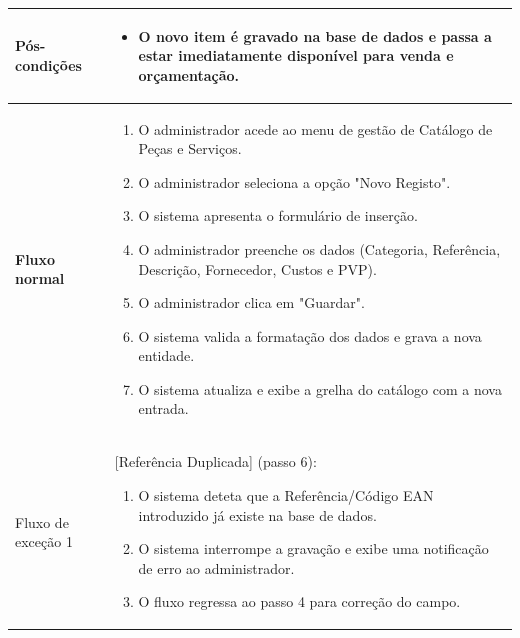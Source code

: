 \documentclass[a4paper,12pt]{scrreprt}
\begin{document}
\begin{longtable}{|>{\columncolor{black!10}\bfseries}p{3.5cm}|p{11.5cm}|}
Pós-condições & 
\begin{itemize}[leftmargin=*, nosep, topsep=2pt, partopsep=0pt]
    \item O novo item é gravado na base de dados e passa a estar imediatamente disponível para venda e orçamentação.
\end{itemize} \\ \hline

Fluxo normal & 
\begin{enumerate}[leftmargin=*, nosep, topsep=2pt, partopsep=0pt]
    \item O administrador acede ao menu de gestão de Catálogo de Peças e Serviços.
    \item O administrador seleciona a opção "Novo Registo".
    \item O sistema apresenta o formulário de inserção.
    \item O administrador preenche os dados (Categoria, Referência, Descrição, Fornecedor, Custos e PVP).
    \item O administrador clica em "Guardar".
    \item O sistema valida a formatação dos dados e grava a nova entidade.
    \item O sistema atualiza e exibe a grelha do catálogo com a nova entrada.
\end{enumerate} \\ \hline

Fluxo de exceção 1 & [Referência Duplicada] (passo 6):
\begin{enumerate}[label=6.\arabic*., leftmargin=*, nosep, topsep=2pt, partopsep=0pt]
    \item O sistema deteta que a Referência/Código EAN introduzido já existe na base de dados.
    \item O sistema interrompe a gravação e exibe uma notificação de erro ao administrador.
    \item O fluxo regressa ao passo 4 para correção do campo.
\end{enumerate} \\ \hline

\end{longtable}

\end{document}
